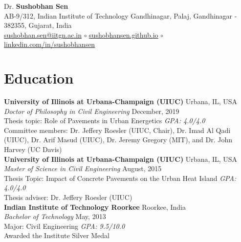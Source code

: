\documentclass[12pt]{article}
\begin{document}
 \sloppy %
\begin{center}
{\large Dr. \textbf{Sushobhan Sen}} \\
AB-9/312, Indian Institute of Technology Gandhinagar, Palaj, Gandhinagar - 382355, Gujarat, India \\
\href{mailto:sushobhan.sen@iitgn.ac.in}{sushobhan.sen@iitgn.ac.in} $\circ$ \href{http://sushobhansen.github.io/}{sushobhansen.github.io} $\circ$ \href{http://linkedin.com/in/sushobhansen}{linkedin.com/in/sushobhansen}
\end{center} 

\hfill %
\section*{Education}
\bigskip 
\textbf{University of Illinois at Urbana-Champaign (UIUC)} \hfill Urbana, IL, USA\\
\textit{Doctor of Philosophy in Civil Engineering} \hfill December, 2019\\
Thesis topic: Role of Pavements in Urban Energetics \hfill \textit{GPA: 4.0/4.0}\\
Committee members: Dr. Jeffery Roesler (UIUC, Chair), Dr. Imad Al Qadi (UIUC), Dr. Arif Masud (UIUC), Dr. Jeremy Gregory (MIT), and Dr. John Harvey (UC Davis)\\

\textbf{University of Illinois at Urbana-Champaign (UIUC)} \hfill Urbana, IL, USA\\
\textit{Master of Science in Civil Engineering} \hfill August, 2015\\
Thesis Topic: Impact of Concrete Pavements on the Urban Heat Island \hfill \textit{GPA: 4.0/4.0} \\
Thesis adviser: Dr. Jeffery Roesler (UIUC) \\

\textbf{Indian Institute of Technology Roorkee} \hfill Roorkee, India\\
\textit{Bachelor of Technology} \hfill May, 2013\\
Major: Civil Engineering \hfill \textit{GPA: 9.5/10.0} \\
Awarded the Institute Silver Medal  %
\end{document}
